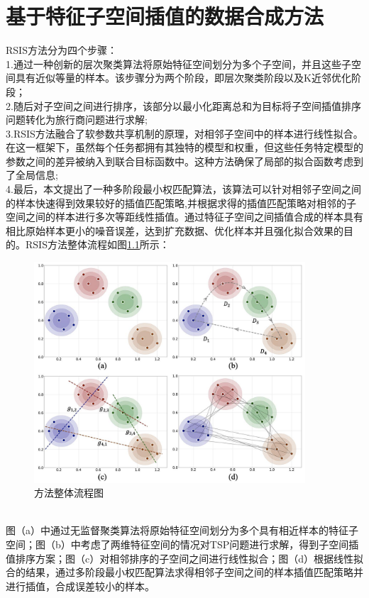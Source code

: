 \documentclass{NauThesis}
\begin{document}
\chapter{基于特征子空间插值的数据合成方法}
RSIS方法分为四个步骤：
\\\hspace*{2em}1.通过一种创新的层次聚类算法将原始特征空间划分为多个子空间，并且这些子空间具有近似等量的样本。该步骤分为两个阶段，即层次聚类阶段以及K近邻优化阶段； 
\\\hspace*{2em}2.随后对子空间之间进行排序，该部分以最小化距离总和为目标将子空间插值排序问题转化为旅行商问题进行求解; 
\\\hspace*{2em}3.RSIS方法融合了软参数共享机制的原理，对相邻子空间中的样本进行线性拟合。在这一框架下，虽然每个任务都拥有其独特的模型和权重，但这些任务特定模型的参数之间的差异被纳入到联合目标函数中。这种方法确保了局部的拟合函数考虑到了全局信息;
\\\hspace*{2em}4.最后，本文提出了一种多阶段最小权匹配算法，该算法可以针对相邻子空间之间的样本快速得到效果较好的插值匹配策略,并根据求得的插值匹配策略对相邻的子空间之间的样本进行多次等距线性插值。通过特征子空间之间插值合成的样本具有相比原始样本更小的噪音误差，达到扩充数据、优化样本并且强化拟合效果的目的。RSIS方法整体流程如图\ref{fig1}所示：
\begin{figure}[htbp]
    \centering
    \includegraphics[width=0.9\textwidth]{figs/fig1.jpeg}
    \caption{方法整体流程图}
    \label{fig1}
\end{figure}
\\\hspace*{2em}图（a）中通过无监督聚类算法将原始特征空间划分为多个具有相近样本的特征子空间；图（b）中考虑了两维特征空间的情况对TSP问题进行求解，得到子空间插值排序方案；图（c）对相邻排序的子空间之间进行线性拟合；图（d）根据线性拟合的结果，通过多阶段最小权匹配算法求得相邻子空间之间的样本插值匹配策略并进行插值，合成误差较小的样本。
\end{document}
